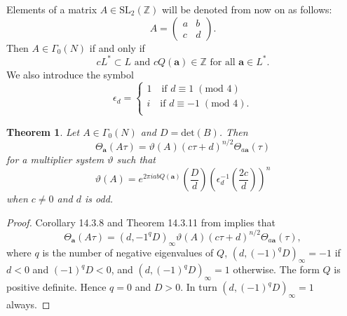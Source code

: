 \documentclass{article}
\newtheorem{theorem}{Theorem}[section]
\theoremstyle{definition}
\newcommand{\ZZ} {{\mathbb Z}}		%
\begin{document}
Elements of a matrix $A \in \mathrm{SL}_2( \ZZ)$ will be denoted from now on as follows:
\begin{equation}
\label{eq:matrix}
A=\begin{pmatrix}
a & b \\ c & d
\end{pmatrix}.\end{equation}
Then $A \in \Gamma_0(N)$ if and only if
\[  cL^{\ast} \subset L \textrm{ and } cQ(\mathbf{a}) \in  
\ZZ \textrm{ for all } \mathbf{a} \in L^{\ast}. \]
We also introduce the symbol 
\begin{equation}
\label{eq:epsilondef}
\epsilon_d  = \begin{cases}
1 \quad \textrm{if } d\equiv 1 \; (\textrm{mod } 4) \\
i \quad \textrm{if } d\equiv -1 \; (\textrm{mod } 4). \\
\end{cases}
\end{equation}

\begin{theorem} 
	\label{thm:modthm}
	Let $A \in \Gamma_0(N)$ and  $D = \mathrm{det}(B)$.
	Then
	\[ \Theta_{\mathbf{a}}(A\tau)= \vartheta(A)(c\tau+d)^{n/2} \Theta_{a\mathbf{a}}(\tau) \]
	for a multiplier system $\vartheta$ such that
	\[ \vartheta(A)=e^{2 \pi i ab Q(\mathbf{a})}
	 \left(\frac{D}{d}\right)\left(\epsilon^{-1}_d \left(\frac{2c}{d}\right)\right)^n \]
	when $c \neq 0$ and $d$ is odd.
\end{theorem}
\begin{proof}
Corollary 14.3.8 and Theorem 14.3.11 from \cite{cohen2017modular} implies that
\[ \Theta_{\mathbf{a}}(A\tau)= (d,-1^{q}D)_{\infty}\vartheta(A)(c\tau+d)^{n/2}
\Theta_{a\mathbf{a}}(\tau), \]
where $q$ is the number of negative eigenvalues of $Q$, $(d,(-1)^{q}D)_{\infty}= -1$ if 
$d<0$ and $(-1)^{q}D < 0$, and $(d,(-1)^{q}D)_{\infty}= 1$ otherwise. The form $Q$ is 
positive definite. Hence $q=0$ and $D>0$. In turn $(d,(-1)^{q}D)_{\infty}= 1$ always.
\end{proof}
\end{document}
